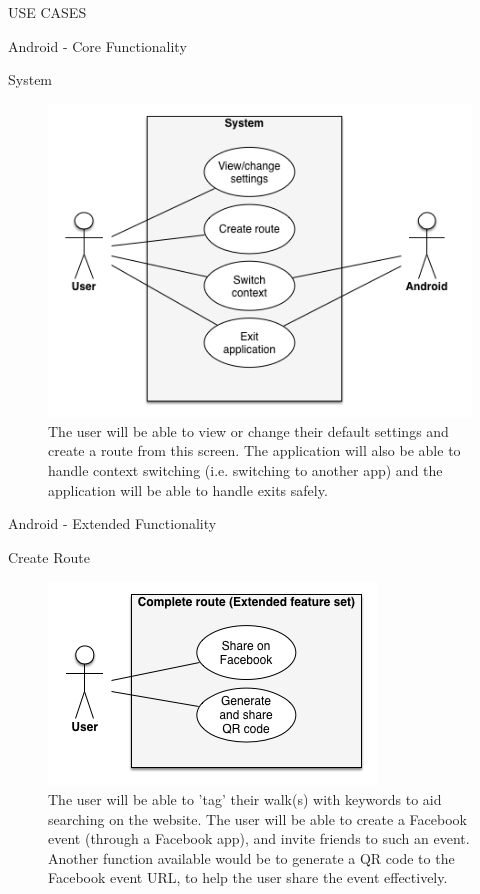 \documentclass{article}
\begin{document}
\begin{section}{USE CASES}
\begin{subsection}{Android - Core Functionality}
			\clearpage
			\begin{subsubsection}{System}
				\begin{figure}[h!]
					\begin{center}
						\includegraphics[height=0.55\columnwidth]{images/UseCase/Android/Core/System.png}
					\end{center}
					\caption{The user will be able to view or change their default settings and create a route from this screen. The application will also be able to handle context switching (i.e. switching to another app) and the application will be able to handle exits safely.}
				\end{figure}
			\end{subsubsection}
		\end{subsection}
		
		\clearpage
		\begin{subsection}{Android - Extended Functionality}
			\begin{subsubsection}{Create Route}
				\begin{figure}[h!]
					\begin{center}
						\includegraphics[height=0.3\columnwidth]{images/UseCase/Android/Extended/CompleteRoute_Extended.png}
					\end{center}
					\caption{The user will be able to 'tag' their walk(s) with keywords to aid searching on the website. The user will be able to create a Facebook event (through a Facebook app), and invite friends to such an event. Another function available would be to generate a QR code to the Facebook event URL, to help the user share the event effectively.}
				\end{figure}
			\end{subsubsection}
			

\end{subsection}
\end{section}
\end{document}
